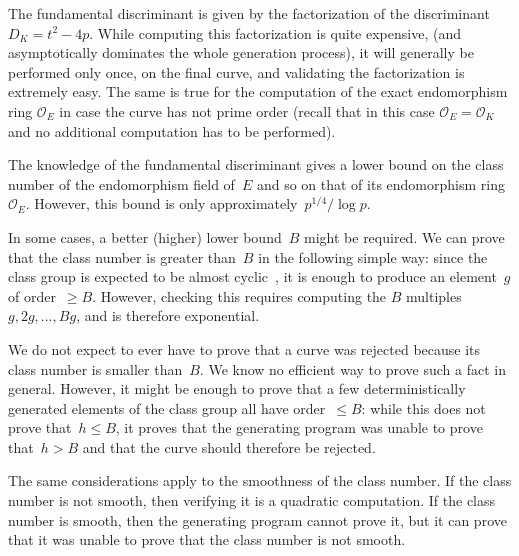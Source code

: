 \documentclass[twocolumn,letterpaper,10pt]{article}
\let\ro\mathcal
\begin{document}
The fundamental discriminant is given by
the factorization of the discriminant~$D_K = t^2 - 4 p$.
While computing this factorization is quite expensive,
(and asymptotically dominates the whole generation process),
it will generally be performed only once, on the final curve,
and validating the factorization is extremely easy.
The same is true for the computation of the exact endomorphism
ring $\ro O_E$ in case the curve has not prime order (recall that
in this case $\ro O_E = \ro O_K$ and no additional computation has
to be performed).

The knowledge of the fundamental discriminant gives a lower bound
on the class number of the endomorphism field of~$E$
and so on that of its endomorphism ring~$\ro O_E$.
However, this bound is only approximately~$p^{1/4}/\log p$.

\smallskip

In some cases, a better (higher) lower bound~$B$ might be required.
We can prove that the class number is greater than~$B$
in the following simple way:
since the class group is expected to be almost cyclic~\cite{nt1984cl},
it is enough to produce an element~$g$ of order~$≥ B$.
However, checking this requires
computing the $B$ multiples~$g, 2g, …, B g$,
and is therefore exponential.

We do not expect to ever have to prove that a curve was rejected
because its class number is smaller than~$B$.
We know no efficient way to prove such a fact in general.
However, it might be enough to prove
that a few deterministically generated elements of the class group
all have order~$≤ B$:
while this does not prove that~$h ≤ B$,
it proves that the generating program was unable to prove that~$h > B$
and that the curve should therefore be rejected.

\smallskip

The same considerations apply to the smoothness of the class number.
If the class number is not smooth, then
verifying it is a quadratic computation.
If the class number is smooth, then
the generating program cannot prove it,
but it can prove that it was unable to prove that
the class number is not smooth.



\end{document}
